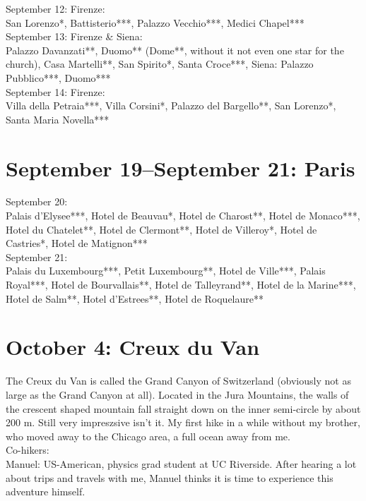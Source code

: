September 12: Firenze:\\
San Lorenzo*, Battisterio***,  Palazzo Vecchio***, Medici Chapel***\\

September 13: Firenze \& Siena:\\
Palazzo Davanzati**, Duomo** (Dome**, without it not even one star for the church), Casa Martelli**, San Spirito*, Santa Croce***, Siena: Palazzo Pubblico***, Duomo***\\

September 14: Firenze:\\
Villa della Petraia***, Villa Corsini*, Palazzo del Bargello**, San Lorenzo*, Santa Maria Novella***

\section{September 19--September 21: Paris}
\label{Paris2014}

September 20:\\
Palais d'Elysee***, Hotel de Beauvau*, Hotel de Charost**, Hotel de Monaco***, Hotel du Chatelet**, Hotel de Clermont**, Hotel de Villeroy*, Hotel de Castries*, Hotel de Matignon***\\

September 21:\\
Palais du Luxembourg***, Petit Luxembourg**, Hotel de Ville***, Palais Royal***, Hotel de Bourvallais**, Hotel de Talleyrand**, Hotel de la Marine***, Hotel de Salm**, Hotel d'Estrees**, Hotel de Roquelaure**

\section{October 4: Creux du Van}
\label{Creuxduvan2014}

The Creux du Van is called the Grand Canyon of Switzerland (obviously not as large as the Grand Canyon at all). Located in the Jura Mountains, the walls of the crescent shaped mountain fall straight down on the inner semi-circle by about 200 m. Still very impreszsive isn't it. My first hike in a while without my brother, who moved away to the Chicago area, a full ocean away from me.\\

Co-hikers:\\
Manuel: US-American, physics grad student at UC Riverside. After hearing a lot about trips and travels with me, Manuel thinks it is time to experience this adventure himself.\\

